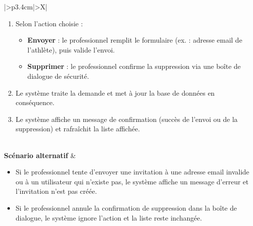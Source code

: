 \documentclass[a4paper,12pt]{report}
\begin{document}
\begin{table}[H]
\begin{tabularx}{\textwidth}{|>{\RaggedRight\arraybackslash}p{3.4cm}|>{\RaggedRight\arraybackslash}X|}
\begin{minipage}[t]{\linewidth}
\begin{enumerate}[label=\arabic*., leftmargin=*, topsep=0pt, itemsep=1pt]
    \begin{itemize}[leftmargin=*, topsep=1pt, itemsep=1pt]
        \item \textbf{Ajouter un nouvel athlète} : cliquer sur le bouton permettant d'inviter un client. 
        \item \textbf{Annuler une demande} : sélectionner une invitation en attente (ou un lien existant) et cliquer sur l'icône de suppression. 
    \end{itemize}
    \item Selon l'action choisie :
    \begin{itemize}[leftmargin=*, topsep=1pt, itemsep=1pt]
        \item \textbf{Envoyer} : le professionnel remplit le formulaire (ex. : adresse email de l'athlète), puis valide l'envoi.
        \item \textbf{Supprimer} : le professionnel confirme la suppression via une boîte de dialogue de sécurité.
    \end{itemize}
    \item Le système traite la demande et met à jour la base de données en conséquence.
    \item Le système affiche un message de confirmation (succès de l'envoi ou de la suppression) et rafraîchit la liste affichée.
\end{enumerate}
\vspace{2pt}
\end{minipage} \\
\hline
\textbf{Scénario alternatif} &
\begin{minipage}[t]{\linewidth}\sloppy
\vspace{2pt}
\begin{itemize}[leftmargin=*, topsep=0pt, itemsep=1pt]
    \item  Si le professionnel tente d'envoyer une invitation à une adresse email invalide ou à un utilisateur qui n'existe pas, le système affiche un message d'erreur et l'invitation n'est pas créée.
    \item  Si le professionnel annule la confirmation de suppression dans la boîte de dialogue, le système ignore l'action et la liste reste inchangée.
\end{itemize}
\vspace{2pt}
\end{minipage} \\
\hline
\end{tabularx}
\fussy

\end{table}
\endgroup
\end{document}

